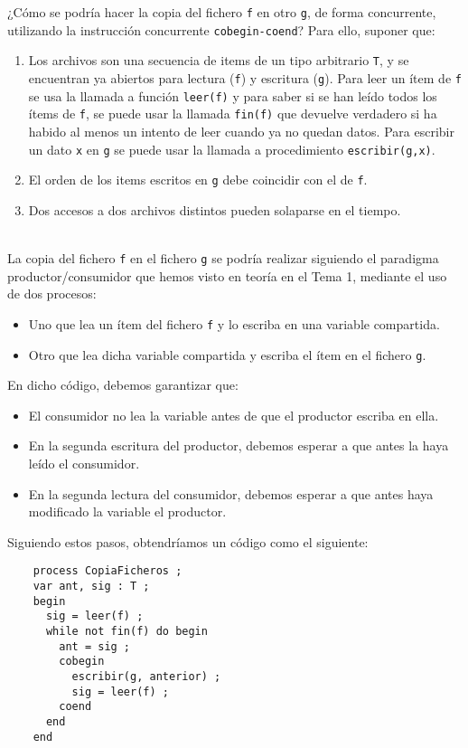 \begin{ejercicio}
    ¿Cómo se podría hacer la copia del fichero \verb|f| en otro \verb|g|, de forma concurrente, utilizando la
    instrucción concurrente \verb|cobegin-coend|? Para ello, suponer que:
    \begin{enumerate}
        \item Los archivos son una secuencia de items de un tipo arbitrario \verb|T|, y se encuentran ya abiertos
        para lectura (\verb|f|) y escritura (\verb|g|). Para leer un ítem de \verb|f| se usa la llamada a función \verb|leer(f)| y
        para saber si se han leído todos los ítems de \verb|f|, se puede usar la llamada \verb|fin(f)| que devuelve
        verdadero si ha habido al menos un intento de leer cuando ya no quedan datos. Para
        escribir un dato \verb|x| en \verb|g| se puede usar la llamada a procedimiento \verb|escribir(g,x)|.

        \item El orden de los items escritos en \verb|g| debe coincidir con el de \verb|f|.
        \item Dos accesos a dos archivos distintos pueden solaparse en el tiempo.
    \end{enumerate}~\\

\noindent
La copia del fichero \verb|f| en el fichero \verb|g| se podría realizar siguiendo el paradigma productor/consumidor que hemos visto en teoría en el Tema 1, mediante el uso de dos procesos:
\begin{itemize}
    \item Uno que lea un ítem del fichero \verb|f| y lo escriba en una variable compartida.
    \item Otro que lea dicha variable compartida y escriba el ítem en el fichero \verb|g|.
\end{itemize}
En dicho código, debemos garantizar que:
\begin{itemize}
    \item El consumidor no lea la variable antes de que el productor escriba en ella.
    \item En la segunda escritura del productor, debemos esperar a que antes la haya leído el consumidor.
    \item En la segunda lectura del consumidor, debemos esperar a que antes haya modificado la variable el productor.
\end{itemize}
Siguiendo estos pasos, obtendríamos un código como el siguiente:
\begin{verbatim}
    process CopiaFicheros ;
    var ant, sig : T ;
    begin
      sig = leer(f) ;
      while not fin(f) do begin
        ant = sig ;
        cobegin
          escribir(g, anterior) ;
          sig = leer(f) ;
        coend
      end
    end
\end{verbatim}


\end{ejercicio}

